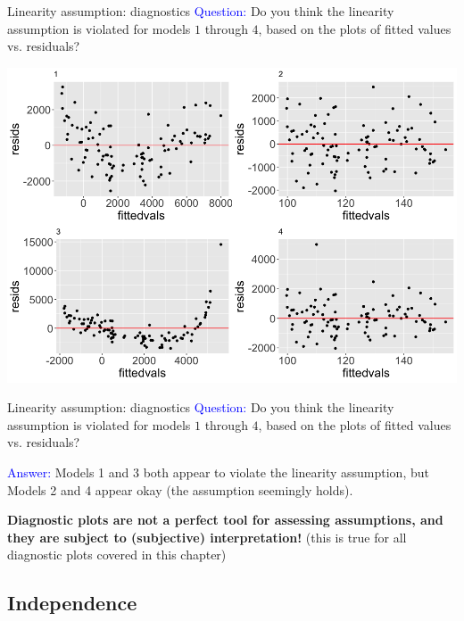 \documentclass[10pt,t]{beamer}
\begin{document}
\begin{frame}{Linearity assumption: diagnostics}
\textcolor{blue}{Question:} Do you think the linearity assumption is violated for models $1$ through $4$, based on the plots of fitted values vs. residuals?

\centering \includegraphics[scale=0.25]{lin_diagnostics_example.png}

\end{frame}

\begin{frame}{Linearity assumption: diagnostics}
\textcolor{blue}{Question:} Do you think the linearity assumption is violated for models $1$ through $4$, based on the plots of fitted values vs. residuals?

\vspace{0.3cm}

\textcolor{blue}{Answer:} Models 1 and 3 both appear to violate the linearity assumption, but Models 2 and 4 appear okay (the assumption seemingly holds). 

\vspace{0.3cm}

\textbf{Diagnostic plots are not a perfect tool for assessing assumptions, and they are subject to (subjective) interpretation!} (this is true for all diagnostic plots covered in this chapter)
\end{frame}


\subsection{Independence}
\end{document}
